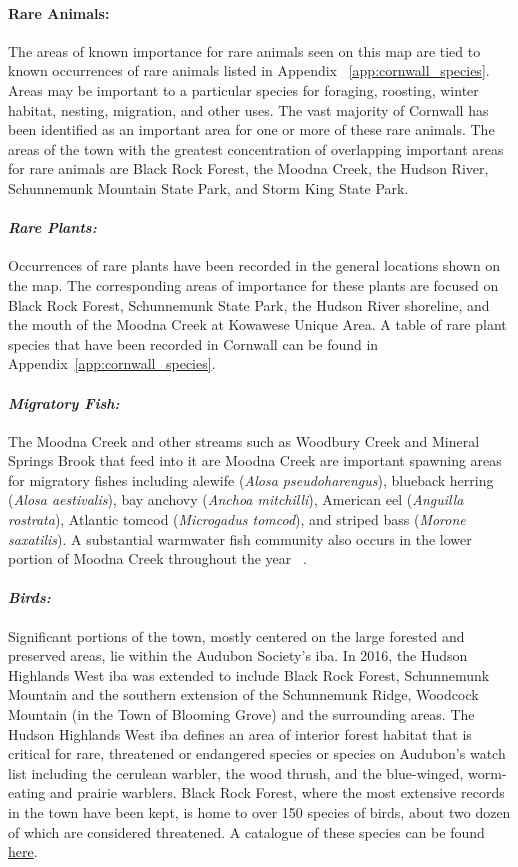 \paragraph{Rare Animals:} The areas of known importance for rare animals seen
on this map are tied to known occurrences of rare animals listed in
Appendix ~\ref{app:cornwall_species}. Areas may be important to a particular
species for foraging, roosting, winter habitat, nesting, migration, and other
uses. The vast majority of Cornwall has been identified as an important area
for one or more of these rare animals. The areas of the town with the greatest
concentration of overlapping important areas for rare animals are Black Rock
Forest, the Moodna Creek, the Hudson River, Schunnemunk Mountain State Park,
and Storm King State Park.
\paragraph{\textit{Rare Plants:}} Occurrences of rare plants have been recorded 
in the general locations shown on the map. The corresponding areas of importance for
these plants are focused on Black Rock Forest, Schunnemunk State Park, the
Hudson River shoreline, and the mouth of the Moodna Creek at Kowawese Unique
Area. A table of rare plant species that have been recorded in Cornwall can be
found in Appendix~\ref{app:cornwall_species}.
\paragraph{\textit{Migratory Fish:}} The Moodna Creek and other streams such as 
Woodbury Creek and Mineral Springs Brook that feed into it are Moodna Creek are 
important spawning areas for migratory fishes including alewife (\textit{Alosa 
pseudoharengus}), blueback herring (\textit{Alosa aestivalis}), bay anchovy 
(\textit{Anchoa mitchilli}), American eel (\textit{Anguilla rostrata}), 
Atlantic tomcod (\textit{Microgadus tomcod}), and striped bass (\textit{Morone 
saxatilis}). A substantial warmwater fish community also occurs in the lower 
portion of Moodna Creek throughout the year ~\citep{nysdosmoodna}. 
\paragraph{\textit{Birds:}} Significant portions of the town, mostly centered 
on the large forested and preserved areas, lie within the Audubon Society's 
\gls{iba}. In 2016, the Hudson Highlands West \gls{iba} was extended to include 
Black Rock Forest, Schunnemunk Mountain and the southern extension of the 
Schunnemunk Ridge, Woodcock Mountain (in the Town of Blooming Grove) and the 
surrounding areas. The Hudson Highlands West \gls{iba} defines an area of 
interior forest habitat that is critical for rare, threatened or endangered 
species or species on Audubon's watch list including the cerulean warbler, the 
wood thrush, and the blue-winged, worm-eating and prairie warblers. Black Rock 
Forest, where the most extensive records in the town have been kept, is home to 
over 150 species of birds, about two dozen of which are considered threatened. 
A catalogue of these species can be found 
\href{
http://blackrockforest.org/files/blackrock/content/brf\_bird\_checklist\_current
\_for\_web\_0.pdf}{here}. 
